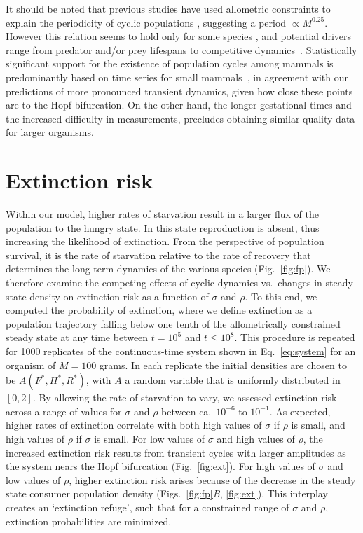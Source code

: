 \documentclass[twocolumn,preprintnumbers,amsmath,amssymb,superscriptaddress]{revtex4}
\begin{document}
It should be noted that previous studies have used allometric constraints to
explain the periodicity of cyclic populations
\cite{CalderIII:1983jd,Peterson:1984hj,Krukonis:1991fk}, suggesting a period
$\propto M^{0.25}$.  However this relation seems to hold only for some
species \cite{Hendriks:2012fc}, and potential drivers range from predator
and/or prey lifespans to competitive
dynamics~\cite{Kendall:1999iy,Hogstedt:2005cr}.  Statistically significant
support for the existence of population cycles among mammals is predominantly
based on time series for small mammals~\cite{Kendall:1998hl}, in agreement
with our predictions of more pronounced transient dynamics, given how close
these points are to the Hopf bifurcation.  On the other hand, the longer
gestational times and the increased difficulty in measurements, precludes
obtaining similar-quality data for larger organisms.  

\section*{Extinction risk}
Within our model, higher rates of starvation result in a larger flux of the
population to the hungry state.  In this state reproduction is absent, thus
increasing the likelihood of extinction.  From the perspective of population
survival, it is the rate of starvation relative to the rate of recovery that
determines the long-term dynamics of the various species (Fig.~\ref{fig:fp}).
We therefore examine the competing effects of cyclic dynamics vs.\ changes in
steady state density on extinction risk as a function of $\sigma$ and $\rho$.
To this end, we computed the probability of extinction, where we define
extinction as a population trajectory falling below one tenth of the
allometrically constrained steady state at any time between $t=10^5$ and
$t \leq 10^8$.  This procedure is repeated for 1000 replicates of the
continuous-time system shown in Eq.~\ref{eq:system} for an organism of
$M=100$ grams.  In each replicate the initial densities are chosen to be
$A(F^*,H^*,R^*)$, with $A$ a random variable that is uniformly distributed in
$[0,2]$.  By allowing the rate of starvation to vary, we assessed extinction
risk across a range of values for $\sigma$ and $\rho$ between ca.\ $10^{-6}$
to $10^{-1}$.  As expected, higher rates of extinction correlate with both
high values of $\sigma$ if $\rho$ is small, and high values of $\rho$ if
$\sigma$ is small.  For low values of $\sigma$ and high values of $\rho$, the
increased extinction risk results from transient cycles with larger
amplitudes as the system nears the Hopf bifurcation (Fig.~\ref{fig:ext}).
For high values of $\sigma$ and low values of $\rho$, higher extinction risk
arises because of the decrease in the steady state consumer population
density (Figs.~\ref{fig:fp}\emph{B}, \ref{fig:ext}).  This interplay creates
an `extinction refuge', such that for a constrained range of $\sigma$ and
$\rho$, extinction probabilities are minimized.
\end{document}

